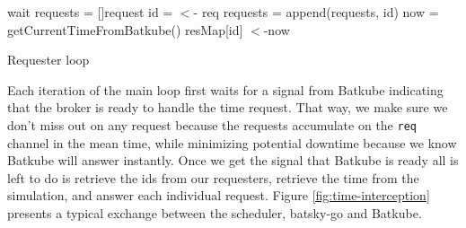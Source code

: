 \begin{algorithm}[]
\DontPrintSemicolon
{}
 {
	wait\;
}
requests = []request\;
 {
	id = $<$- req 
	requests = append(requests, id)\;
}
now = getCurrentTimeFromBatkube()\;
 {
	resMap[id] $<$-now 
}

\caption{Requester loop}
\label{alg:reqLoop}
\end{algorithm}

Each iteration of the main loop first waits for a signal from Batkube
indicating that the broker is ready to handle the time request. That way, we
make sure we don't miss out on any request because the requests accumulate on
the \texttt{req} channel in the mean time, while minimizing potential downtime
because we know Batkube will answer instantly. Once we get the signal that
Batkube is ready all is left to do is retrieve the ids from our requesters,
retrieve the time from the simulation, and answer each individual request.
Figure \ref{fig:time-interception} presents a typical exchange between the
scheduler, batsky-go and Batkube.

